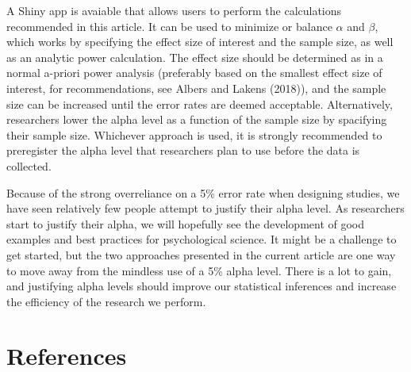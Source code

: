 \documentclass[
  english,
  ,jou,floatsintext]{apa6}
\begin{document}
A Shiny app is avaiable that allows users to perform the calculations recommended in this article. It can be used to minimize or balance \(\alpha\) and \(\beta\), which works by specifying the effect size of interest and the sample size, as well as an analytic power calculation. The effect size should be determined as in a normal a-priori power analysis (preferably based on the smallest effect size of interest, for recommendations, see Albers and Lakens (2018)), and the sample size can be increased until the error rates are deemed acceptable. Alternatively, researchers lower the alpha level as a function of the sample size by spacifying their sample size. Whichever approach is used, it is strongly recommended to preregister the alpha level that researchers plan to use before the data is collected.

Because of the strong overreliance on a 5\% error rate when designing studies, we have seen relatively few people attempt to justify their alpha level. As researchers start to justify their alpha, we will hopefully see the development of good examples and best practices for psychological science. It might be a challenge to get started, but the two approaches presented in the current article are one way to move away from the mindless use of a 5\% alpha level. There is a lot to gain, and justifying alpha levels should improve our statistical inferences and increase the efficiency of the research we perform.

\hypertarget{references}{%
\section{References}\label{references}}

\setlength{\parindent}{-0.5in}
\setlength{\leftskip}{0.5in}
\end{document}
